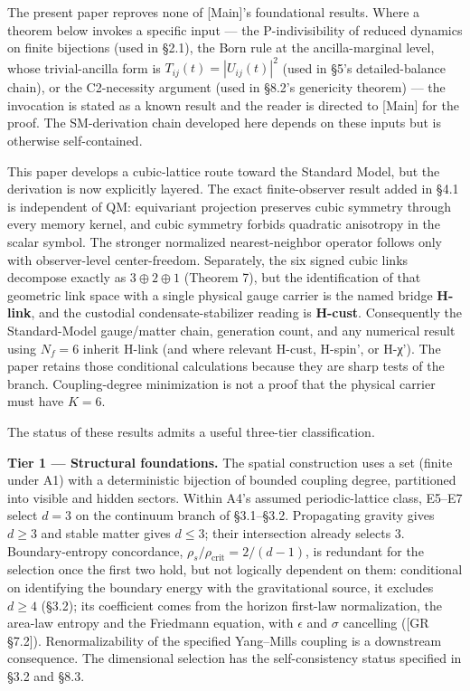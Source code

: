 \documentclass[
]{article}
\begin{document}
The present paper reproves none of {[}Main{]}'s foundational results.
Where a theorem below invokes a specific input --- the P-indivisibility
of reduced dynamics on finite bijections (used in §2.1), the Born rule
at the ancilla-marginal level, whose trivial-ancilla form is
\(T_{ij}(t) = |U_{ij}(t)|^2\) (used in §5's detailed-balance chain), or
the C2-necessity argument (used in §8.2's genericity theorem) --- the
invocation is stated as a known result and the reader is directed to
{[}Main{]} for the proof. The SM-derivation chain developed here depends
on these inputs but is otherwise self-contained.

This paper develops a cubic-lattice route toward the Standard Model, but
the derivation is now explicitly layered. The exact finite-observer
result added in §4.1 is independent of QM: equivariant projection
preserves cubic symmetry through every memory kernel, and cubic symmetry
forbids quadratic anisotropy in the scalar symbol. The stronger
normalized nearest-neighbor operator follows only with observer-level
center-freedom. Separately, the six signed cubic links decompose exactly
as \(3\oplus2\oplus1\) (Theorem 7), but the identification of that
geometric link space with a single physical gauge carrier is the named
bridge \textbf{H-link}, and the custodial condensate-stabilizer reading
is \textbf{H-cust}. Consequently the Standard-Model gauge/matter chain,
generation count, and any numerical result using \(N_f=6\) inherit
H-link (and where relevant H-cust, H-spin', or H-χ'). The paper retains
those conditional calculations because they are sharp tests of the
branch. Coupling-degree minimization is not a proof that the physical
carrier must have \(K=6\).

The status of these results admits a useful three-tier classification.

\textbf{Tier 1 --- Structural foundations.} The spatial construction
uses a set (finite under A1) with a deterministic bijection of bounded
coupling degree, partitioned into visible and hidden sectors. Within
A4's assumed periodic-lattice class, E5--E7 select \(d=3\) on the
continuum branch of §3.1--§3.2. Propagating gravity gives \(d\geq3\) and
stable matter gives \(d\leq3\); their intersection already selects
\(3\). Boundary-entropy concordance,
\(\rho_s/\rho_{\text{crit}}=2/(d-1)\), is redundant for the selection
once the first two hold, but not logically dependent on them:
conditional on identifying the boundary energy with the gravitational
source, it excludes \(d\geq4\) (§3.2); its coefficient comes from the
horizon first-law normalization, the area-law entropy and the Friedmann
equation, with \(\epsilon\) and \(\sigma\) cancelling ({[}GR §7.2{]}).
Renormalizability of the specified Yang--Mills coupling is a downstream
consequence. The dimensional selection has the self-consistency status
specified in §3.2 and §8.3.
\end{document}
